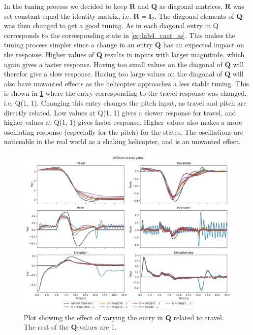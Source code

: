 \documentclass[../main.tex]{subfiles}
\begin{document}
In the tuning process we decided to keep $ \bm R $ and $ \bm Q $ as diagonal matrices. $ \bm R $ was set constant equal the identity matrix, i.e. $\bm R = \bm I_2$. The diagonal elements of $ \bm Q $ was then changed to get a good tuning. As in each diagonal entry in Q corresponds to the corresponding state in \cref{eq:lab4_cont_ss}. This makes the tuning process simpler since a change in an entry $ \bm Q $ has an expected impact on the response. Higher values of $ \bm Q $ results in inputs with larger magnitude, which again gives a faster response. Having too small values on the diagonal of $ \bm Q $ will therefor give a slow response. Having too large values on the diagonal of $ \bm Q $ will also have unwanted effects as the helicopter approaches a less stable tuning. This is shown in \cref{fig:lab4_diff_Q_values} where the entry corresponding to the travel response was changed, i.e. Q(1, 1). Changing this entry changes the pitch input, as travel and pitch are directly related. Low values at Q(1, 1) gives a slower response for travel, and higher values at Q(1, 1) gives faster response. Higher values also makes a more oscillating response (especially for the pitch) for the states. The oscillations are noticeable in the real world as a shaking helicopter, and is an unwanted effect.
\begin{figure}[h]
	\centering
	\includegraphics[width=\linewidth]{figures/LAB4_travel_gains.png}
	\caption{Plot showing the effect of varying the entry in $ \bm Q $ related to travel. The rest of the $ \bm Q $-values are 1.}
	\label{fig:lab4_diff_Q_values}
\end{figure}
\end{document}
